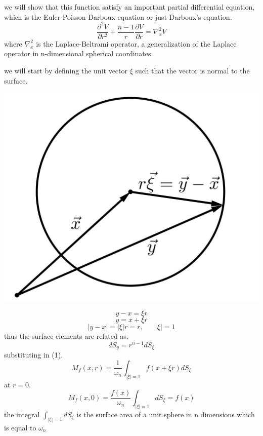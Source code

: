 \documentclass[]{article}
\begin{document}
we will show that this function satisfy an important partial differential equation, which is the Euler-Poisson-Darboux equation or just Darboux's equation.
\begin{equation}
\frac{\partial^2 V}{\partial r^2} + \frac{n-1}{r}\frac{\partial V}{\partial r} = \nabla_{x}^{2} V
\end{equation} 
where $\nabla_{x}^{2}$ is the Laplace-Beltrami operator, a generalization of the Laplace operator in n-dimensional spherical coordinates.
\par
we will start by defining the unit vector $\xi$ such that the vector is normal to the surface.
\begin{center}
\includegraphics[scale=0.1]{xi.png}
\end{center}
\[
    y-x = \xi r    
\]
\begin{equation}
y = x + \xi r
\end{equation}
\[
    |y-x| = |\xi|r = r, \;\;\;\;\;\; |\xi| = 1    
\]
thus the surface elements are related as.
\[
    dS_y = r^{n-1} dS_\xi    
\]
substituting in (1).
\begin{equation}
M_{f}(x,r) = \frac{1}{\omega_{n}} \int_{|\xi|=1} f(x+\xi r)dS_\xi
\end{equation} 
at $r = 0$. 
\begin{equation}
M_{f}(x,0) = \frac{f(x)}{\omega_{n}} \int_{|\xi|=1} dS_\xi = f(x)
\end{equation}
the integral $\displaystyle \int_{|\xi|=1} dS_\xi$ is the surface area of a unit sphere in n dimensions which is equal to $\omega_n$
\end{document}
